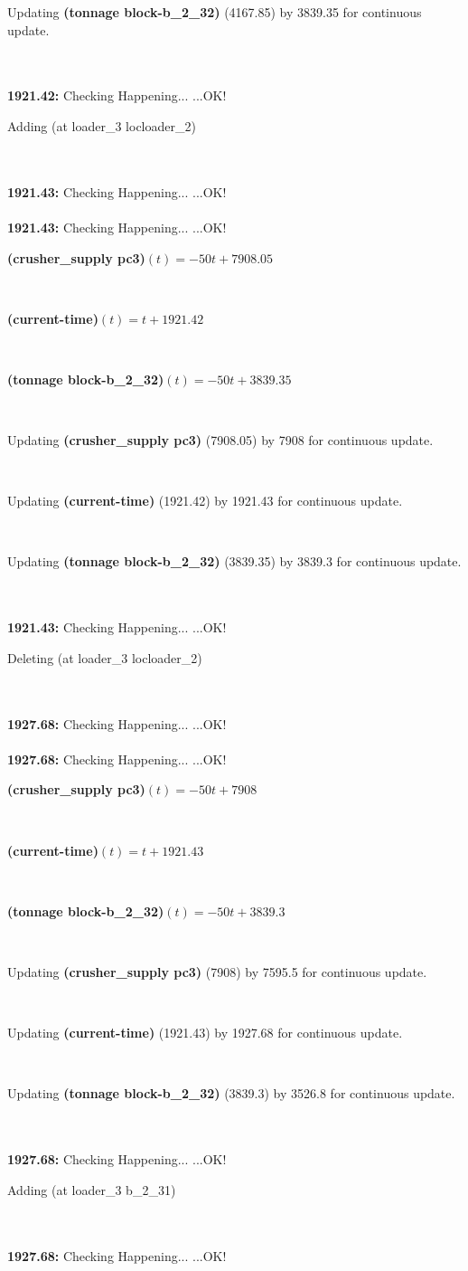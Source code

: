 \documentclass[a4paper,12pt]{article}
\newcommand{\atime}[1]{{\bf #1:}}
\newcommand{\exprn}[1]{{\sf #1}}
\newcommand{\fexprn}[1]{{\small {\bf #1}}}
\newcommand{\checkhappening}{Checking Happening... }
\newcommand{\listrow}[1]{\begin{minipage}[t]{11.5cm} #1 \end{minipage}}
\newcommand{\happeningOK}{...OK!}
\newcommand{\assignmentcts}[3]{\listrow{Updating \fexprn{#1} (#2) by #3 for continuous update.}}
\newcommand{\function}[2]{\listrow{\fexprn{#1}$(t) = #2$}}
\newcommand{\adding}[1]{\listrow{Adding \exprn{#1} }}
\newcommand{\deleting}[1]{\listrow{Deleting \exprn{#1} }}
\begin{document}
\begin{tabbing}
 \> \assignmentcts{(tonnage block-b\_2\_32)}{4167.85}{3839.35}\\
\\
\atime{1921.42} \> \checkhappening\happeningOK\\
 \> \adding{(at loader\_3 locloader\_2)}\\
\\
\atime{1921.43} \> \checkhappening\happeningOK\\
\\
\atime{1921.43} \> \checkhappening\happeningOK\\
 \> \function{(crusher\_supply pc3)}{ - 50t + 7908.05}\\
 \> \function{(current-time)}{t + 1921.42}\\
 \> \function{(tonnage block-b\_2\_32)}{ - 50t + 3839.35}\\
 \> \assignmentcts{(crusher\_supply pc3)}{7908.05}{7908}\\
 \> \assignmentcts{(current-time)}{1921.42}{1921.43}\\
 \> \assignmentcts{(tonnage block-b\_2\_32)}{3839.35}{3839.3}\\
\\
\atime{1921.43} \> \checkhappening\happeningOK\\
 \> \deleting{(at loader\_3 locloader\_2)}\\
\\
\atime{1927.68} \> \checkhappening\happeningOK\\
\\
\atime{1927.68} \> \checkhappening\happeningOK\\
 \> \function{(crusher\_supply pc3)}{ - 50t + 7908}\\
 \> \function{(current-time)}{t + 1921.43}\\
 \> \function{(tonnage block-b\_2\_32)}{ - 50t + 3839.3}\\
 \> \assignmentcts{(crusher\_supply pc3)}{7908}{7595.5}\\
 \> \assignmentcts{(current-time)}{1921.43}{1927.68}\\
 \> \assignmentcts{(tonnage block-b\_2\_32)}{3839.3}{3526.8}\\
\\
\atime{1927.68} \> \checkhappening\happeningOK\\
 \> \adding{(at loader\_3 b\_2\_31)}\\
\\
\atime{1927.68} \> \checkhappening\happeningOK\\
\\

\end{tabbing}
\end{document}
